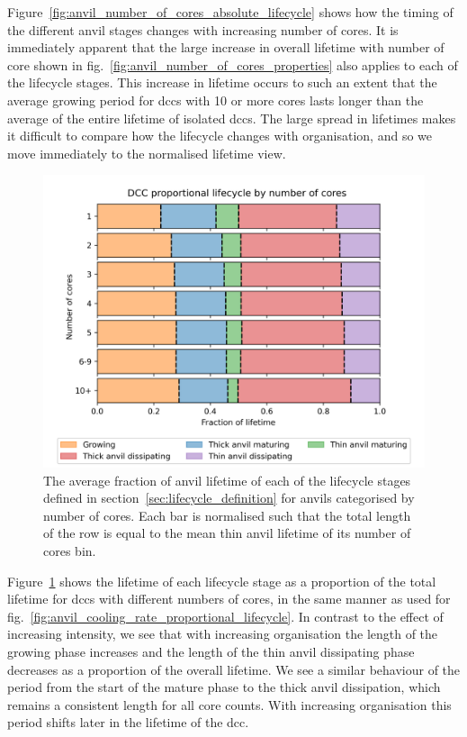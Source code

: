 Figure~\ref{fig:anvil_number_of_cores_absolute_lifecycle} shows how the timing of the different anvil stages changes with increasing number of cores.
It is immediately apparent that the large increase in overall lifetime with number of core shown in fig.~\ref{fig:anvil_number_of_cores_properties} also applies to each of the lifecycle stages.
This increase in lifetime occurs to such an extent that the average growing period for \acrshort{dcc}s with 10 or more cores lasts longer than the average of the entire lifetime of isolated \acrshort{dcc}s.
The large spread in lifetimes makes it difficult to compare how the lifecycle changes with organisation, and so we move immediately to the normalised lifetime view.

\begin{figure}[tp]
    \centering
    \includegraphics[width=\textwidth]{figures/chapter3_12.png}
    \caption[
    The average fraction of anvil lifetime of each lifecycle stage for anvils categorised by number of cores
    ]{
    The average fraction of anvil lifetime of each of the lifecycle stages defined in section~\ref{sec:lifecycle_definition} for anvils categorised by number of cores. Each bar is normalised such that the total length of the row is equal to the mean thin anvil lifetime of its number of cores bin.
    }
    \label{fig:anvil_number_of_cores_proportional_lifecycle}
\end{figure}

Figure~\ref{fig:anvil_number_of_cores_proportional_lifecycle} shows the lifetime of each lifecycle stage as a proportion of the total lifetime for \acrshort{dcc}s with different numbers of cores, in the same manner as used for fig.~\ref{fig:anvil_cooling_rate_proportional_lifecycle}.
In contrast to the effect of increasing intensity, we see that with increasing organisation the length of the growing phase increases and the length of the thin anvil dissipating phase decreases as a proportion of the overall lifetime.
We see a similar behaviour of the period from the start of the mature phase to the thick anvil dissipation, which remains a consistent length for all core counts.
With increasing organisation this period shifts later in the lifetime of the \acrshort{dcc}.

